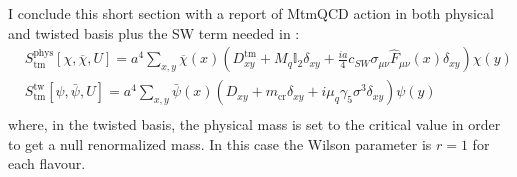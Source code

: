 \documentclass[english, LaM, oneside, noexaminfo]{sapthesis}
\begin{document}
I conclude this short section with a report of MtmQCD action in both physical and twisted basis plus the SW term needed in \cite{FR1}:
\begin{equation*}
    \begin{aligned}
        & S^\text{phys}_\text{tm} [\chi,\overline{\chi},U] = a^4 \sum_{x,y} \overline{\chi} (x) \left( D_{xy}^\text{tm} + M_q \mathbb{I}_2 \delta_{xy} + \frac{ia}{4}c_{SW}\sigma_{\mu\nu}\hat F_{\mu\nu} (x) \delta_{xy} \right) \chi (y) \\
        & S^\text{tw}_\text{tm}[\psi,\bar \psi, U] = a^4 \sum_{x,y} \bar \psi(x) \left( D_{xy} + m_\text{cr} \delta_{xy} + i \mu_q \gamma_5 \sigma^3 \delta_{xy} \right) \psi (y)  \\
    \end{aligned}
\end{equation*}
where, in the twisted basis, the physical mass is set to the critical value in order to get a null renormalized mass.
In this case the Wilson parameter is $r=1$ for each flavour.
\end{document}
